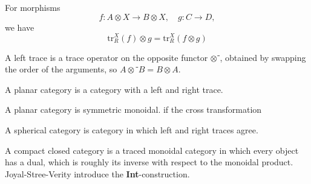 \begin{axiom}[Superposing]
        \label{axiom:superimposing}
	For morphisms
	$$
		f : A \otimes X \to B \otimes X,
		\quad g : C \to D,
	$$
	we have
	$$
		\mathrm{tr}_{R}^{X}(f) \otimes g
		= \mathrm{tr}_{R}^{X}(f \otimes g)
	$$
\end{axiom}
\begin{definition}
A left trace is a trace operator on the opposite functor $⊗⁻$, obtained by swapping the order of the arguments, so $A ⊗⁻ B = B ⊗ A$.
\cite{joyal1996-traced-monoidal-categories}
\end{definition}
\begin{definition}
A planar category is a category with a left and right trace.
\cite{joyal1996-traced-monoidal-categories}
\end{definition}
\begin{definition}
A planar category is symmetric monoidal. if the cross transformation 
\cite{joyal1996-traced-monoidal-categories}
\end{definition}
\begin{definition}
A spherical category is category in which left and right traces agree.
\cite{barrett1999-spherical}
\end{definition}

\begin{definition}
A compact closed category is a traced monoidal category in which every
object has a dual, which is roughly its inverse with respect to the
monoidal product. Joyal-Stree-Verity introduce the \textbf{Int}-construction.
\cite{joyal1996-traced-monoidal-categories}
\end{definition}
